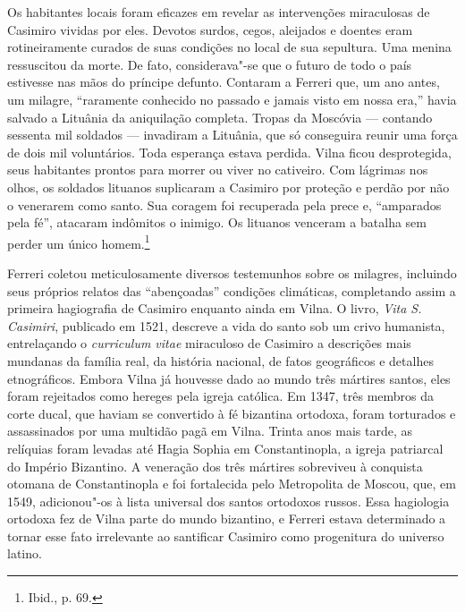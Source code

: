 Os habitantes locais foram eficazes em revelar as intervenções
miraculosas de Casimiro vividas por eles. Devotos surdos, cegos,
aleijados e doentes eram rotineiramente curados de suas condições no
local de sua sepultura. Uma menina ressuscitou da morte. De fato,
considerava"-se que o futuro de todo o país estivesse nas mãos do
príncipe defunto. Contaram a Ferreri que, um ano antes, um milagre,
``raramente conhecido no passado e jamais visto em nossa era,'' havia
salvado a Lituânia da aniquilação completa. Tropas da Moscóvia ---
contando sessenta mil soldados --- invadiram a Lituânia, que só conseguira
reunir uma força de dois mil voluntários. Toda esperança estava perdida.
Vilna ficou desprotegida, seus habitantes prontos para morrer ou viver
no cativeiro. Com lágrimas nos olhos, os soldados lituanos suplicaram a
Casimiro por proteção e perdão por não o venerarem como santo. Sua
coragem foi recuperada pela prece e, ``amparados pela fé'', atacaram
indômitos o inimigo. Os lituanos venceram a batalha sem perder um único
homem.\footnote{Ibid., p. 69.}

%

Ferreri coletou meticulosamente diversos testemunhos sobre os milagres,
incluindo seus próprios relatos das ``abençoadas'' condições climáticas,
completando assim a primeira hagiografia de Casimiro enquanto ainda em
Vilna. O livro, \emph{Vita S. Casimiri}, publicado em 1521, descreve a
vida do santo sob um crivo humanista, entrelaçando o \emph{curriculum
vitae} miraculoso de Casimiro a descrições mais mundanas da família
real, da história nacional, de fatos geográficos e detalhes
etnográficos. Embora Vilna já houvesse dado ao mundo três mártires
santos, eles foram rejeitados como hereges pela igreja católica. Em
1347, três membros da corte ducal, que haviam se convertido à fé
bizantina ortodoxa, foram torturados e assassinados por uma multidão
pagã em Vilna. Trinta anos mais tarde, as relíquias foram levadas até
Hagia Sophia em Constantinopla, a igreja patriarcal do Império
Bizantino. A veneração dos três mártires sobreviveu à conquista otomana
de Constantinopla e foi fortalecida pelo Metropolita de Moscou, que, em
1549, adicionou"-os à lista universal dos santos ortodoxos russos. Essa
hagiologia ortodoxa fez de Vilna parte do mundo bizantino, e Ferreri
estava determinado a tornar esse fato irrelevante ao santificar Casimiro
como progenitura do universo latino.

